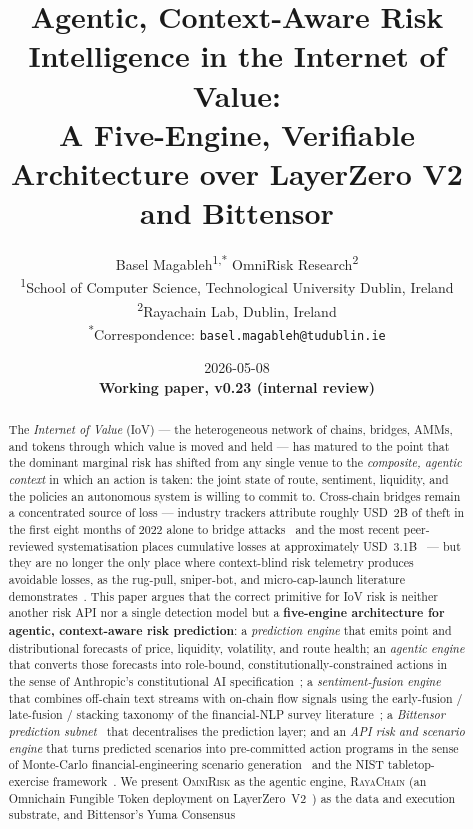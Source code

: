 \documentclass[11pt,a4paper]{article}
\title{Agentic, Context-Aware Risk Intelligence in the Internet of Value:\\
       A Five-Engine, Verifiable Architecture over LayerZero V2 and Bittensor}
\author{%
  Basel Magableh\textsuperscript{1,*} \quad\quad OmniRisk Research\textsuperscript{2} \\[0.8em]
  \normalsize\textsuperscript{1}School of Computer Science, Technological University Dublin, Ireland \\
  \normalsize\textsuperscript{2}Rayachain Lab, Dublin, Ireland \\[0.4em]
  \normalsize\textsuperscript{*}Correspondence: \texttt{basel.magableh@tudublin.ie}
}
\date{2026-05-08 \\ \textbf{Working paper, v0.23 (internal review)}}
\begin{document}
\maketitle

\begin{abstract}
The \emph{Internet of Value} (IoV) --- the heterogeneous network of chains, bridges, AMMs,
and tokens through which value is moved and held --- has matured to the point that the
dominant marginal risk has shifted from any single venue to the \emph{composite, agentic
context} in which an action is taken: the joint state of route, sentiment, liquidity,
and the policies an autonomous system is willing to commit to. Cross-chain bridges
remain a concentrated source of loss --- industry trackers attribute roughly USD~2B of
theft in the first eight months of 2022 alone to bridge attacks~\cite{chainalysis2022bridges}
and the most recent peer-reviewed systematisation places cumulative losses at
approximately USD~3.1B~\cite{augusto2024sok} --- but they are no longer the only place
where context-blind risk telemetry produces avoidable losses, as the rug-pull, sniper-bot,
and micro-cap-launch literature demonstrates~\cite{cernera2023token}. This paper argues
that the correct primitive for IoV risk is neither another risk API nor a single
detection model but a \textbf{five-engine architecture for agentic, context-aware risk
prediction}: a \emph{prediction engine} that emits point and distributional forecasts of
price, liquidity, volatility, and route health; an \emph{agentic engine} that converts
those forecasts into role-bound, constitutionally-constrained actions in the sense of
Anthropic's constitutional AI specification~\cite{bai2022constitutional}; a
\emph{sentiment-fusion engine} that combines off-chain text streams with on-chain flow
signals using the early-fusion / late-fusion / stacking taxonomy of the financial-NLP
survey literature~\cite{schumaker2009textual,xing2018natural,day2016deep}; a
\emph{Bittensor prediction subnet}~\cite{rao2021bittensor,opentensor2024yuma,
taoshi2024ptn} that decentralises the prediction layer; and an \emph{API risk and
scenario engine} that turns predicted scenarios into pre-committed action programs in
the sense of Monte-Carlo financial-engineering scenario generation~\cite{glasserman2003monte}
and the NIST tabletop-exercise framework~\cite{nist2006sp80084}. We present
\textsc{OmniRisk} as the agentic engine, \textsc{RayaChain} (an Omnichain Fungible Token
deployment on LayerZero~V2~\cite{zarick2024layerzero,layerzero2024oft}) as the data and
execution substrate, and Bittensor's Yuma Consensus~\cite{steeves2022incentivizing}

\end{abstract}
\end{document}
